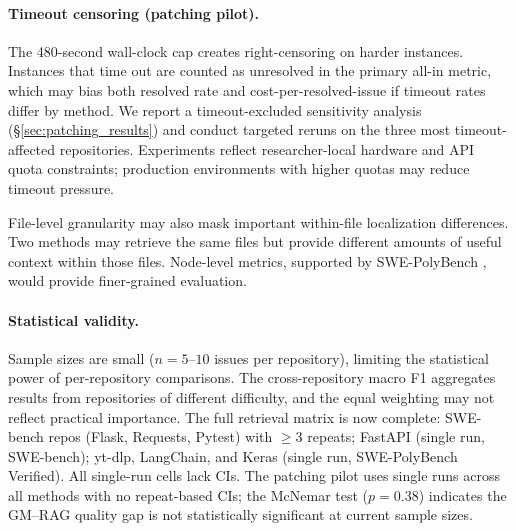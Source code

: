 \paragraph{Timeout censoring (patching pilot).}
The 480-second wall-clock cap creates right-censoring on harder instances. Instances that time out are counted as unresolved in the primary all-in metric, which may bias both resolved rate and cost-per-resolved-issue if timeout rates differ by method. We report a timeout-excluded sensitivity analysis (\S\ref{sec:patching_results}) and conduct targeted reruns on the three most timeout-affected repositories. Experiments reflect researcher-local hardware and API quota constraints; production environments with higher quotas may reduce timeout pressure.

File-level granularity may also mask important within-file localization differences. Two methods may retrieve the same files but provide different amounts of useful context within those files. Node-level metrics, supported by SWE-PolyBench \citep{swepolybench2025}, would provide finer-grained evaluation.

\paragraph{Statistical validity.}
Sample sizes are small ($n = 5$--$10$ issues per repository), limiting the statistical power of per-repository comparisons. The cross-repository macro F1 aggregates results from repositories of different difficulty, and the equal weighting may not reflect practical importance. The full retrieval matrix is now complete: SWE-bench repos (Flask, Requests, Pytest) with $\geq 3$ repeats; FastAPI (single run, SWE-bench); yt-dlp, LangChain, and Keras (single run, SWE-PolyBench Verified). All single-run cells lack CIs. The patching pilot uses single runs across all methods with no repeat-based CIs; the McNemar test ($p=0.38$) indicates the GM--RAG quality gap is not statistically significant at current sample sizes.
